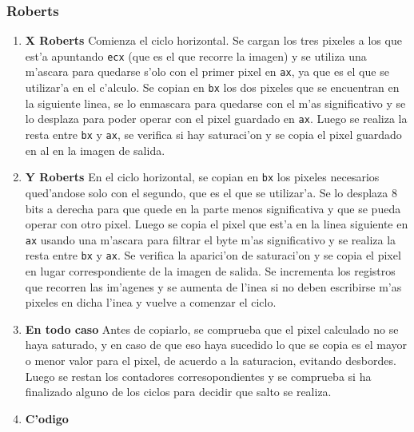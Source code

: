 \documentclass[11pt]{article}
\begin{document}
\subsubsection{Roberts} 
\begin{enumerate}
\item \textbf{X Roberts}
\subitem Comienza el ciclo horizontal. Se cargan los tres pixeles a los que est'a apuntando \verb'ecx' (que es el que recorre la imagen) y se utiliza una m'ascara para quedarse s'olo con el primer pixel en \verb'ax', ya que es el que se utilizar'a en el c'alculo.
Se copian en \verb'bx' los dos pixeles que se encuentran en la siguiente linea, se lo enmascara para quedarse con el m'as significativo y se lo desplaza para poder operar con el pixel guardado en \verb'ax'.
Luego se realiza la resta entre \verb'bx' y \verb'ax', se verifica si hay saturaci'on y se copia el pixel guardado en al en la imagen de salida.
\item \textbf{Y Roberts}
\subitem En el ciclo horizontal, se copian en \verb'bx' los pixeles necesarios qued'andose solo con el segundo, que es el que se utilizar'a. Se lo desplaza 8 bits a derecha para que quede en la parte menos significativa y que se pueda operar con otro pixel. Luego se copia el pixel que est'a en la linea siguiente en \verb'ax' usando una m'ascara para filtrar el byte m'as significativo y se realiza la resta entre \verb'bx' y \verb'ax'. Se verifica la aparici'on de saturaci'on y se copia el pixel en lugar correspondiente de la imagen de salida.
Se incrementa los registros que recorren las im'agenes y se aumenta de l'inea si no deben escribirse m'as pixeles en dicha l'inea y vuelve a comenzar el ciclo.
\item \textbf{En todo caso}
\subitem Antes de copiarlo, se comprueba que el pixel calculado no se haya saturado, y en caso de que eso haya sucedido lo que se copia es el mayor o menor valor para el pixel, de acuerdo a la saturacion, evitando desbordes.
Luego se restan los contadores corresopondientes y se comprueba si ha finalizado alguno de los ciclos para decidir que salto se realiza.
\item \textbf{C'odigo}
\end{enumerate}
\end{document}
